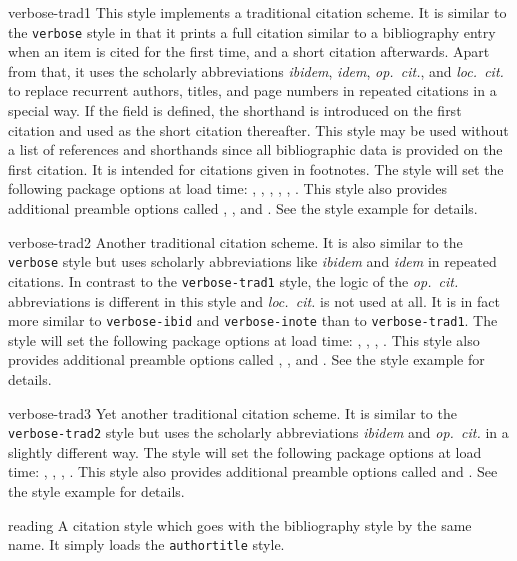 \documentclass{ltxdockit}[2011/03/25]
\begin{document}
\begin{marglist}
\item[verbose-trad1]
This style implements a traditional citation scheme. It is similar to the \texttt{verbose} style in that it prints a full citation similar to a bibliography entry when an item is cited for the first time, and a short citation afterwards. Apart from that, it uses the scholarly abbreviations \emph{ibidem}, \emph{idem}, \emph{op.~cit.}, and \emph{loc.~cit.} to replace recurrent authors, titles, and page numbers in repeated citations in a special way. If the  field is defined, the shorthand is introduced on the first citation and used as the short citation thereafter. This style may be used without a list of references and shorthands since all bibliographic data is provided on the first citation. It is intended for citations given in footnotes. The style will set the following package options at load time: , , , , , . This style also provides additional preamble options called , , and . See the style example for details.

\item[verbose-trad2]
Another traditional citation scheme. It is also similar to the \texttt{verbose} style but uses scholarly abbreviations like \emph{ibidem} and \emph{idem} in repeated citations. In contrast to the \texttt{verbose-trad1} style, the logic of the \emph{op.~cit.} abbreviations is different in this style and \emph{loc.~cit.} is not used at all. It is in fact more similar to \texttt{verbose-ibid} and \texttt{verbose-inote} than to \texttt{verbose-trad1}. The style will set the following package options at load time: , , , . This style also provides additional preamble options called , , and . See the style example for details.

\item[verbose-trad3]
Yet another traditional citation scheme. It is similar to the \texttt{verbose-trad2} style but uses the scholarly abbreviations \emph{ibidem} and \emph{op.~cit.} in a slightly different way. The style will set the following package options at load time: , , , . This style also provides additional preamble options called  and . See the style example for details.

\item[reading]
A citation style which goes with the bibliography style by the same name. It simply loads the \texttt{authortitle} style.

\end{marglist}
\end{document}
